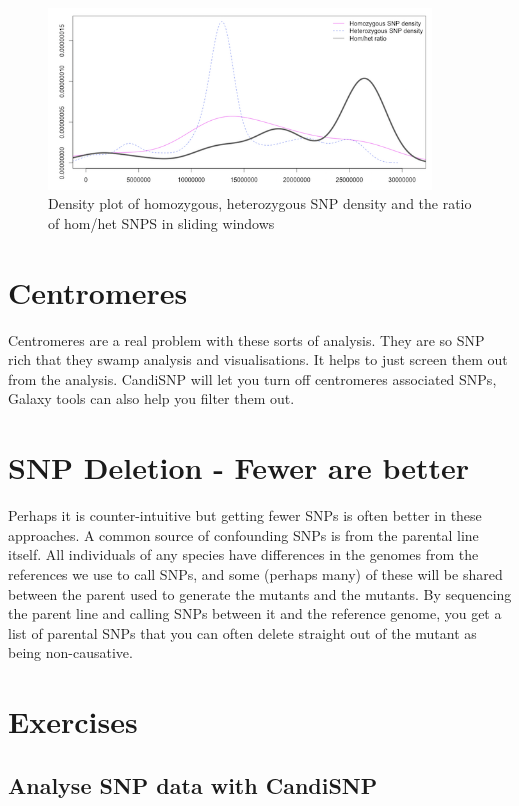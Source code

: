 \documentclass[12pt,]{book}
\theoremstyle{definition}
\theoremstyle{definition}
\theoremstyle{remark}
\begin{document}
\begin{figure}
\includegraphics[width=4in]{assets/density} \caption{Density plot of homozygous, heterozygous SNP density and
the ratio of hom/het SNPS in sliding windows}\label{fig:densityp}
\end{figure}

\section{Centromeres}\label{centromeres}

Centromeres are a real problem with these sorts of analysis. They are so
SNP rich that they swamp analysis and visualisations. It helps to just
screen them out from the analysis. CandiSNP will let you turn off
centromeres associated SNPs, Galaxy tools can also help you filter them
out.

\section{SNP Deletion - Fewer are
better}\label{snp-deletion---fewer-are-better}

Perhaps it is counter-intuitive but getting fewer SNPs is often better
in these approaches. A common source of confounding SNPs is from the
parental line itself. All individuals of any species have differences in
the genomes from the references we use to call SNPs, and some (perhaps
many) of these will be shared between the parent used to generate the
mutants and the mutants. By sequencing the parent line and calling SNPs
between it and the reference genome, you get a list of parental SNPs
that you can often delete straight out of the mutant as being
non-causative.

\section{Exercises}\label{exercises-3}

\subsection{Analyse SNP data with
CandiSNP}\label{analyse-snp-data-with-candisnp}
\end{document}
